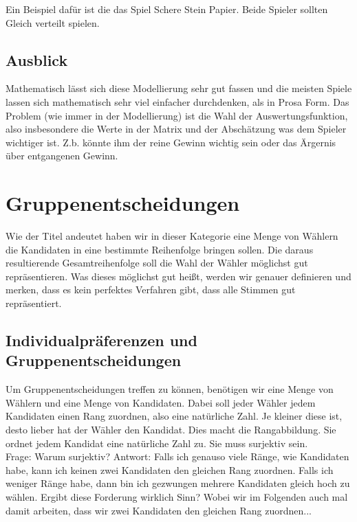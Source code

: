 \documentclass[]{article}
\begin{document}
Ein Beispiel dafür ist die das Spiel Schere Stein Papier. Beide Spieler sollten Gleich verteilt spielen. 

\subsection{Ausblick}
Mathematisch lässt sich diese Modellierung sehr gut fassen und die meisten Spiele lassen sich mathematisch sehr viel einfacher durchdenken, als in Prosa Form. Das Problem (wie immer in der Modellierung) ist die Wahl der Auswertungsfunktion, also insbesondere die Werte in der Matrix und der Abschätzung was dem Spieler wichtiger ist. Z.b. könnte ihm der reine Gewinn wichtig sein oder das Ärgernis über entgangenen Gewinn.   

\section{Gruppenentscheidungen} 
Wie der Titel andeutet haben wir in dieser Kategorie eine Menge von Wählern die Kandidaten in eine bestimmte Reihenfolge bringen sollen. Die daraus resultierende Gesamtreihenfolge soll die Wahl der Wähler möglichst gut repräsentieren. Was dieses möglichst gut heißt, werden wir genauer definieren und merken, dass es kein perfektes Verfahren gibt, dass alle Stimmen gut repräsentiert. 

\subsection{Individualpräferenzen und Gruppenentscheidungen}

Um Gruppenentscheidungen treffen zu können, benötigen wir eine Menge von Wählern und eine Menge von Kandidaten. Dabei soll jeder Wähler jedem Kandidaten einen Rang zuordnen, also eine natürliche Zahl. Je kleiner diese ist, desto lieber hat der Wähler den Kandidat. Dies macht die Rangabbildung. Sie ordnet jedem Kandidat eine natürliche Zahl zu. Sie muss surjektiv  sein. \\ 

Frage: Warum surjektiv? Antwort: Falls ich genauso viele Ränge, wie Kandidaten habe, kann ich keinen zwei Kandidaten den gleichen Rang zuordnen. Falls ich weniger Ränge habe, dann bin ich gezwungen mehrere Kandidaten gleich hoch zu wählen. Ergibt diese Forderung wirklich Sinn? Wobei wir im Folgenden auch mal damit arbeiten, dass wir zwei Kandidaten den gleichen Rang zuordnen... \\ 
\end{document}
